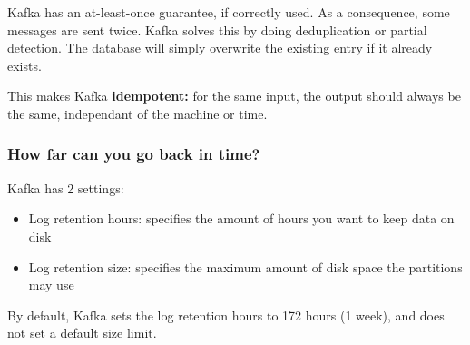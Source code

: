 \documentclass{article}
\begin{document}
Kafka has an at-least-once guarantee, if correctly used. 
As a consequence, some messages are sent twice. 
Kafka solves this by doing deduplication or partial detection.
The database will simply overwrite the existing entry if it already exists.

This makes Kafka \textbf{idempotent:} for the same input, the output should always be
the same, independant of the machine or time.

\subsubsection{How far can you go back in time?}

Kafka has 2 settings:

\begin{itemize}
    \item Log retention hours: specifies the amount of hours you want to keep data on disk
    \item Log retention size: specifies the maximum amount of disk space the partitions may use 
\end{itemize}

By default, Kafka sets the log retention hours to 172 hours (1 week), and does not set a default size limit.
\end{document}
